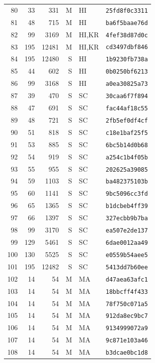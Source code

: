 \begin{longtable}{rrrrll}
80 & 33 & 331 & M & HI & \texttt{25fd8f0c3311} \\
81 & 48 & 715 & M & HI & \texttt{ba6f5baae76d} \\
82 & 99 & 3169 & M & HI,KR & \texttt{4fef38d87d0c} \\
83 & 195 & 12481 & M & HI,KR & \texttt{cd3497dbf846} \\
84 & 195 & 12480 & S & HI & \texttt{1b9230fb738a} \\
85 & 44 & 602 & S & HI & \texttt{0b0250bf6213} \\
86 & 99 & 3168 & S & HI & \texttt{a0ea30825a73} \\
87 & 39 & 470 & S & SC & \texttt{30caa6f7f894} \\
88 & 47 & 691 & S & SC & \texttt{fac44af18c55} \\
89 & 48 & 721 & S & SC & \texttt{2fb5ef0df4cf} \\
90 & 51 & 818 & S & SC & \texttt{c18e1baf25f5} \\
91 & 53 & 885 & S & SC & \texttt{6bc5b14d0b68} \\
92 & 54 & 919 & S & SC & \texttt{a254c1b4f05b} \\
93 & 55 & 955 & S & SC & \texttt{202625a39085} \\
94 & 59 & 1103 & S & SC & \texttt{ba482375103b} \\
95 & 60 & 1141 & S & SC & \texttt{9bc5096cc3fd} \\
96 & 65 & 1365 & S & SC & \texttt{b1dcbeb4ff39} \\
97 & 66 & 1397 & S & SC & \texttt{327ecbb9b7ba} \\
98 & 99 & 3170 & S & SC & \texttt{ea507e2de137} \\
99 & 129 & 5461 & S & SC & \texttt{6dae0012aa49} \\
100 & 130 & 5525 & S & SC & \texttt{e0559b54aee5} \\
101 & 195 & 12482 & S & SC & \texttt{5413dd7b60ee} \\
102 & 14 & 54 & M & MA & \texttt{d47aea63afc1} \\
103 & 14 & 54 & M & MA & \texttt{18bbcff4f433} \\
104 & 14 & 54 & M & MA & \texttt{78f750c071a5} \\
105 & 14 & 54 & M & MA & \texttt{912da8ec9bc7} \\
106 & 14 & 54 & M & MA & \texttt{9134999072a9} \\
107 & 14 & 54 & M & MA & \texttt{9c871e103a46} \\
108 & 14 & 54 & M & MA & \texttt{b3dcae0bc1d8} \\

\end{longtable}
